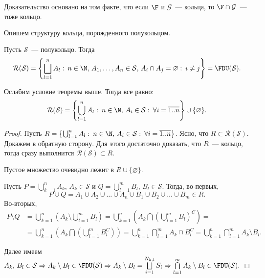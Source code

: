 \begin{remark}
	Доказательство основано на том факте, что если $\F$ и $\mathcal{G}$~--- кольца, то $\F\cap \mathcal{G} $~--- тоже кольцо.
\end{remark}

Опишем структуру кольца, порожденного полукольцом.

\begin{theorem}
	Пусть $\mathcal{S} $~--- полукольцо. Тогда 
	\[
		\mathcal{R} (\mathcal{S} )=\left\{\bigsqcup_{l=1}^{n}A_l:\: n\in\N,\, A_1,\ldots, A_n\in\mathcal{S},\, A_i\cap A_j=\varnothing:
		\: i\neq j\right\} = \FDU(\mathcal{S} ).	
	\]
\end{theorem}

\begin{lemma} Ослабим условие теоремы выше. Тогда все равно:
	\[
		\mathcal{R} (\mathcal{S} )=\left\{\bigcup_{l=1}^{n}A_l:\: n\in\N,\, A_i\in\mathcal{S}: \: \forall i=\overline{1..n}\right\}
		\cup\{\varnothing\}.
	\]


\begin{proof}
	Пусть $R=\left\{\bigcup_{l=1}^{n}A_l:\: n\in\N,\, A_i\in\mathcal{S}: \: \forall i=\overline{1..n}\right\}$. Ясно, что
	$R\subset \mathcal{R} (\mathcal{S} )$. Докажем в обратную сторону. Для этого достаточно доказать, что $R$~--- кольцо, тогда 
	сразу выполнится $\mathcal{R} (\mathcal{S} )\subset R$. 

	Пустое множество очевидно лежит в $R\cup\{\varnothing\}$.
	
	Пусть $P=\bigcup\limits_{k=1}^{n}A_k,\, A_k\in\mathcal{S} $ и $Q=\bigcup\limits_{l=1}^{m}B_l,\, B_l\in\mathcal{S} $. Тогда, во-первых,
	\[P\cup Q=A_1\cup A_2\cup\ldots\cup A_n\cup B_1\cup B_2\cup\ldots\cup B_m\in R.\]
	Во-вторых, 
	\begin{align*}
		P\setminus Q&=\bigcup_{k=1}^{n}\left(A_k\setminus \bigcup_{l=1}^m B_{l}\right)=
		\bigcup_{k=1}^{n}\left(A_k\bigcap \left(\bigcup_{l=1}^m B_{l}\right)^C\right)=\\
		&=\bigcup_{k=1}^{n}\left(A_k\bigcap \left(\bigcup_{l=1}^m B_{l}^C\right)\right)=
		\bigcup_{k=1}^{n}\bigcap_{l=1}^{m}A_k\cap B_l^C=
		\bigcup_{k=1}^{n}\bigcap_{l=1}^{m}A_k\setminus B_l.
	\end{align*}

	Далее имеем $A_k,\, B_l\in \mathcal{S} \Rightarrow A_k\setminus B_l\in \FDU(\mathcal{S})\Rightarrow A_k\setminus 
	B_l=\bigsqcup\limits_{i=1}^{N_{k,l}}S_i\Rightarrow \bigcap\limits_{l=1}^{m}A_k\setminus B_l\in\FDU(\mathcal{S} ).$
\end{proof}
\end{lemma}